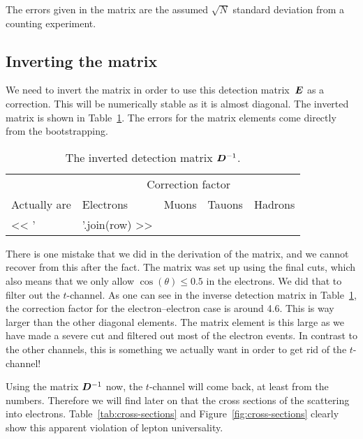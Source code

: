 \documentclass[11pt, english, fleqn, DIV=15, headinclude, BCOR=2cm]{scrreprt}
\begin{document}
The errors given in the matrix are the assumed $\sqrt N$ standard deviation
from a counting experiment.

\subsection{Inverting the matrix}

We need to invert the matrix in order to use this detection matrix~$\mat E$ as
a correction. This will be numerically stable as it is almost diagonal. The
inverted matrix is shown in Table~\ref{tab:inverted}. The errors for the matrix
elements come directly from the bootstrapping.

\begin{table}
    \centering
    \begin{tabular}{lllll}
        \toprule
        & \multicolumn{4}{c}{Correction factor} \\
        \cmidrule(l){2-5}
        {Actually are}
        & {Electrons}
        & {Muons}
        & {Tauons}
        & {Hadrons} \\
        \midrule
        << ' & '.join(row) >> \\
        \bottomrule
    \end{tabular}
    \caption{%
        The inverted detection matrix $\mat D\inv$.
    }
    \label{tab:inverted}
\end{table}

There is one mistake that we did in the derivation of the matrix, and we cannot
recover from this after the fact. The matrix was set up using the final cuts,
which also means that we only allow $\cos(\theta) \leq \num{0.5}$ in the
electrons. We did that to filter out the $t$-channel. As one can see in the
inverse detection matrix in Table~\ref{tab:inverted}, the correction factor for
the electron--electron case is around \num{4.6}. This is way larger than the
other diagonal elements. The matrix element is this large as we have made a
severe cut and filtered out most of the electron events. In contrast to the
other channels, this is something we actually want in order to get rid of the
$t$-channel!

Using the matrix $\mat D\inv$ now, the $t$-channel will come back, at least
from the numbers. Therefore we will find later on that the cross sections of
the scattering into electrons. Table~\ref{tab:cross-sections} and
Figure~\ref{fig:cross-sections} clearly show this apparent violation of lepton
universality.
\end{document}
